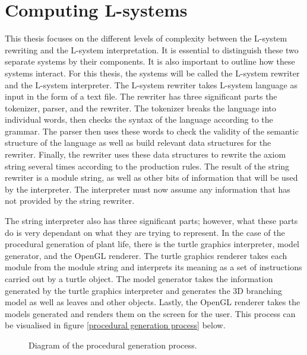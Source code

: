 \section{Computing L-systems}

This thesis focuses on the different levels of complexity between the L-system rewriting and the L-system interpretation. It is essential to distinguish these two separate systems by their components. It is also important to outline how these systems interact. For this thesis, the systems will be called the L-system rewriter and the L-system interpreter. The L-system rewriter takes L-system language as input in the form of a text file. The rewriter has three significant parts the tokenizer, parser, and the rewriter. The tokenizer breaks the language into individual words, then checks the syntax of the language according to the grammar. The parser then uses these words to check the validity of the semantic structure of the language as well as build relevant data structures for the rewriter. Finally, the rewriter uses these data structures to rewrite the axiom string several times according to the production rules. The result of the string rewriter is a module string, as well as other bits of information that will be used by the interpreter. The interpreter must now assume any information that has not provided by the string rewriter. 

The string interpreter also has three significant parts; however, what these parts do is very dependant on what they are trying to represent. In the case of the procedural generation of plant life, there is the turtle graphics interpreter, model generator, and the OpenGL renderer. The turtle graphics renderer takes each module from the module string and interprets its meaning as a set of instructions carried out by a turtle object. The model generator takes the information generated by the turtle graphics interpreter and generates the 3D branching model as well as leaves and other objects. Lastly, the OpenGL renderer takes the models generated and renders them on the screen for the user. This process can be visualised in figure \ref{procedural generation process} below.

\begin{figure}[htbp]
	{\centering
		\setlength{\fboxrule}{1pt}
		\vspace{7px}
		\caption{Diagram of the procedural generation process.}
	}
\end{figure}
\FloatBarrier

